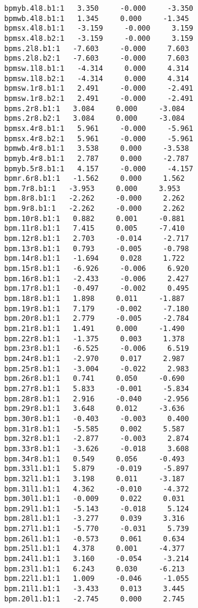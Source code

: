 \begin{verbatim}
bpmyb.4l8.b1:1   3.350     -0.000     -3.350
bpmwb.4l8.b1:1   1.345     0.000     -1.345
bpmsx.4l8.b1:1   -3.159     -0.000     3.159
bpmsx.4l8.b2:1   -3.159     -0.000     3.159
bpms.2l8.b1:1   -7.603     -0.000     7.603
bpms.2l8.b2:1   -7.603     -0.000     7.603
bpmsw.1l8.b1:1   -4.314     0.000     4.314
bpmsw.1l8.b2:1   -4.314     0.000     4.314
bpmsw.1r8.b1:1   2.491     -0.000     -2.491
bpmsw.1r8.b2:1   2.491     -0.000     -2.491
bpms.2r8.b1:1   3.084     0.000     -3.084
bpms.2r8.b2:1   3.084     0.000     -3.084
bpmsx.4r8.b1:1   5.961     -0.000     -5.961
bpmsx.4r8.b2:1   5.961     -0.000     -5.961
bpmwb.4r8.b1:1   3.538     0.000     -3.538
bpmyb.4r8.b1:1   2.787     0.000     -2.787
bpmyb.5r8.b1:1   4.157     -0.000     -4.157
bpmr.6r8.b1:1   -1.562     0.000     1.562
bpm.7r8.b1:1   -3.953     0.000     3.953
bpm.8r8.b1:1   -2.262     -0.000     2.262
bpm.9r8.b1:1   -2.262     -0.000     2.262
bpm.10r8.b1:1   0.882     0.001     -0.881
bpm.11r8.b1:1   7.415     0.005     -7.410
bpm.12r8.b1:1   2.703     -0.014     -2.717
bpm.13r8.b1:1   0.793     -0.005     -0.798
bpm.14r8.b1:1   -1.694     0.028     1.722
bpm.15r8.b1:1   -6.926     -0.006     6.920
bpm.16r8.b1:1   -2.433     -0.006     2.427
bpm.17r8.b1:1   -0.497     -0.002     0.495
bpm.18r8.b1:1   1.898     0.011     -1.887
bpm.19r8.b1:1   7.179     -0.002     -7.180
bpm.20r8.b1:1   2.779     -0.005     -2.784
bpm.21r8.b1:1   1.491     0.000     -1.490
bpm.22r8.b1:1   -1.375     0.003     1.378
bpm.23r8.b1:1   -6.525     -0.006     6.519
bpm.24r8.b1:1   -2.970     0.017     2.987
bpm.25r8.b1:1   -3.004     -0.022     2.983
bpm.26r8.b1:1   0.741     0.050     -0.690
bpm.27r8.b1:1   5.833     -0.001     -5.834
bpm.28r8.b1:1   2.916     -0.040     -2.956
bpm.29r8.b1:1   3.648     0.012     -3.636
bpm.30r8.b1:1   -0.403     -0.003     0.400
bpm.31r8.b1:1   -5.585     0.002     5.587
bpm.32r8.b1:1   -2.877     -0.003     2.874
bpm.33r8.b1:1   -3.626     -0.018     3.608
bpm.34r8.b1:1   0.549     0.056     -0.493
bpm.33l1.b1:1   5.879     -0.019     -5.897
bpm.32l1.b1:1   3.198     0.011     -3.187
bpm.31l1.b1:1   4.362     -0.010     -4.372
bpm.30l1.b1:1   -0.009     0.022     0.031
bpm.29l1.b1:1   -5.143     -0.018     5.124
bpm.28l1.b1:1   -3.277     0.039     3.316
bpm.27l1.b1:1   -5.770     -0.031     5.739
bpm.26l1.b1:1   -0.573     0.061     0.634
bpm.25l1.b1:1   4.378     0.001     -4.377
bpm.24l1.b1:1   3.160     -0.054     -3.214
bpm.23l1.b1:1   6.243     0.030     -6.213
bpm.22l1.b1:1   1.009     -0.046     -1.055
bpm.21l1.b1:1   -3.433     0.013     3.445
bpm.20l1.b1:1   -2.745     0.000     2.745

\end{verbatim}
